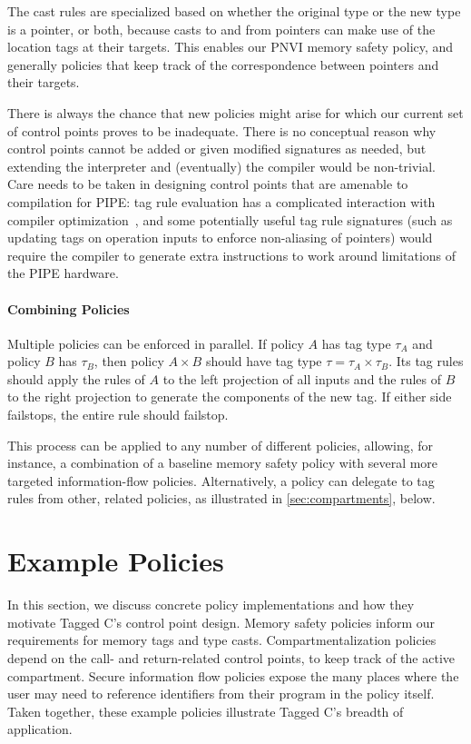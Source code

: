 \documentclass{llncs}
\begin{document}
The cast rules are specialized based on whether the original type or the new type
is a pointer, or both, because casts to and from pointers can make use of the
location tags at their targets. This enables our PNVI memory safety policy, and
generally policies that keep track of the correspondence between pointers and their
targets.

There is always the chance that new policies might arise for which our current set of
control points proves to be inadequate. There is no conceptual reason why
control points cannot be added or given modified signatures as needed,
but extending the interpreter and (eventually) the compiler would be non-trivial.
Care needs to be taken in designing control points that are amenable
to compilation for PIPE: tag rule evaluation has a complicated interaction with
compiler optimization~\cite{Chhak21:Tagine}, and some potentially useful tag
rule signatures (such as updating tags on operation inputs to enforce non-aliasing of pointers)
would require the compiler to generate extra instructions to work
around limitations of the PIPE hardware.

\paragraph{Combining Policies}

Multiple policies can be enforced in parallel. If policy \(A\) has tag type \(\tau_A\)
and policy \(B\) has \(\tau_B\), then policy \(A \times B\) should have tag type
\(\tau = \tau_A \times \tau_B\). Its tag rules should apply the rules of \(A\) to
the left projection of all inputs and the rules of \(B\) to the right projection
to generate the components of the new tag. If either side failstops, the entire
rule should failstop.

This process can be applied to any number of different policies, allowing, for instance,
a combination of a baseline memory safety policy with several more targeted
information-flow policies. Alternatively, a policy can delegate to tag rules
from other, related policies, as illustrated in \cref{sec:compartments}, below.

\section{Example Policies}
\label{sec:policies}

In this section, we discuss concrete policy implementations and how 
they motivate Tagged C's control point design. Memory safety policies
inform our requirements for memory tags and type casts. Compartmentalization
policies depend on the call- and return-related control points, to keep track of the
active compartment. Secure information flow policies expose the many places
where the user may need to reference identifiers from their program in the policy itself.
Taken together, these example policies illustrate Tagged C's breadth of application.
\end{document}
